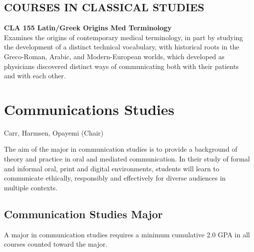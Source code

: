 \documentclass[
  letterpaper,
]{scrbook}
\begin{document}
\subsection{COURSES IN CLASSICAL
STUDIES}\label{courses-in-classical-studies}

\textbf{CLA 155 Latin/Greek Origins Med Terminology}\\
Examines the origins of contemporary medical terminology, in part by
studying the development of a distinct technical vocabulary, with
historical roots in the Greco-Roman, Arabic, and Modern-European worlds,
which developed as physicians discovered distinct ways of communicating
both with their patients and with each other.

\section{Communications Studies}\label{communications-studies}

Carr, Harmsen, Opayemi (Chair)

The aim of the major in communication studies is to provide a background
of theory and practice in oral and mediated communication. In their
study of formal and informal oral, print and digital environments,
students will learn to communicate ethically, responsibly and
effectively for diverse audiences in multiple contexts.

\subsection{Communication Studies
Major}\label{communication-studies-major}

A major in communication studies requires a minimum cumulative 2.0 GPA
in all courses counted toward the major.
\end{document}
